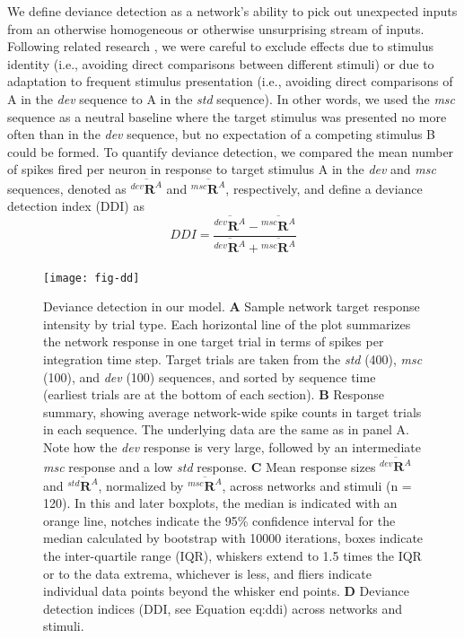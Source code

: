 \documentclass[9pt,lineno,onehalfspacing]{elife}
\newcommand{\dev}{\textit{dev}}
\newcommand{\msc}{\textit{msc}}
\newcommand{\std}{\textit{std}}
\newcommand{\R}[3][]{{}^{#1}_{}\boldsymbol R^{#2}_{#3}}
\newcommand{\mean}[1]{\overline{#1}}
\begin{document}
We define deviance detection as a network's ability to pick out unexpected inputs from an otherwise homogeneous or otherwise unsurprising stream of inputs. Following related research \citep{Kubota2021-dx,Harms2014-ah,Jacobsen2001-sc}, we were careful to exclude effects due to stimulus identity (i.e., avoiding direct comparisons between different stimuli) or due to adaptation to frequent stimulus presentation (i.e., avoiding direct comparisons of A in the \dev{} sequence to A in the \std{} sequence). In other words, we used the \msc{} sequence as a neutral baseline where the target stimulus was presented no more often than in the \dev{} sequence, but no expectation of a competing stimulus B could be formed. To quantify deviance detection, we compared the mean number of spikes fired per neuron in response to target stimulus A in the \dev{} and \msc{} sequences, denoted as $\mean{\R[dev]{A}{}}$ and $\mean{\R[msc]{A}{}}$, respectively, and define a deviance detection index (DDI) as
\begin{equation}
    DDI = \frac{\mean{\R[dev]{A}{}} - \mean{\R[msc]{A}{}}}{\mean{\R[dev]{A}{}} + \mean{\R[msc]{A}{}}} \label{eq:ddi}
\end{equation}

\begin{figure}
    \texttt{[image: fig-dd]}
    \caption{%
        Deviance detection in our model.
        \textbf{A} Sample network target response intensity by trial type. Each horizontal line of the plot summarizes the network response in one target trial in terms of spikes per integration time step. Target trials are taken from the \std{} (400), \msc{} (100), and \dev{} (100) sequences, and sorted by sequence time (earliest trials are at the bottom of each section).
        \textbf{B} Response summary, showing average network-wide spike counts in target trials in each sequence. The underlying data are the same as in panel A. Note how the \dev{} response is very large, followed by an intermediate \msc{} response and a low \std{} response.
        \textbf{C} Mean response sizes $\mean{\R[dev]{A}{}}$ and $\mean{\R[std]{A}{}}$, normalized by $\mean{\R[msc]{A}{}}$, across networks and stimuli (n = 120). In this and later boxplots, the median is indicated with an orange line, notches indicate the 95\% confidence interval for the median calculated by bootstrap with 10000 iterations, boxes indicate the inter-quartile range (IQR), whiskers extend to 1.5 times the IQR or to the data extrema, whichever is less, and fliers indicate individual data points beyond the whisker end points.
        \textbf{D} Deviance detection indices (DDI, see Equation {eq:ddi}) across networks and stimuli.
    }
    \label{fig:DD}
\end{figure}
\end{document}
